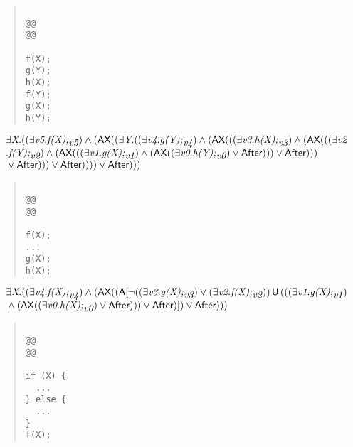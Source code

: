 \documentclass{article}
\newcommand{\U}{\,\mbox{\sf{U}}\,}
\newcommand{\A}{\mbox{\sf{A}}}
\newcommand{\AX}{\mbox{\sf{AX}}}
\newcommand{\mita}[1]{\mbox{\it{{#1}}}}
\newcommand{\msf}[1]{\mbox{\sf{{#1}}}}
\begin{document}
\begin{quote}\begin{verbatim}

@@
@@

f(X);
g(Y);
h(X);
f(Y);
g(X);
h(Y);
\end{verbatim}\end{quote}

\[\begin{array}{l}
\exists \mita{X} . ((\exists \mita{v5} . \mita{f(X);}_{\mita{v5}}) \wedge (\AX((\exists \mita{Y} . ((\exists \mita{v4} . \mita{g(Y);}_{\mita{v4}}) \wedge (\AX(((\exists \mita{v3} . \mita{h(X);}_{\mita{v3}}) \wedge (\AX(((\exists \mita{v2}\\\mbox{} . \mita{f(Y);}_{\mita{v2}}) \wedge (\AX(((\exists \mita{v1} . \mita{g(X);}_{\mita{v1}}) \wedge (\AX((\exists \mita{v0} . \mita{h(Y);}_{\mita{v0}}) \vee \msf{After}))) \vee \msf{After})))\\\mbox{} \vee \msf{After}))) \vee \msf{After})))) \vee \msf{After})))
\end{array}\]

\begin{quote}\begin{verbatim}

@@
@@

f(X);
...
g(X);
h(X);
\end{verbatim}\end{quote}

\[\begin{array}{l}
\exists \mita{X} . ((\exists \mita{v4} . \mita{f(X);}_{\mita{v4}}) \wedge (\AX((\A[\neg ((\exists \mita{v3} . \mita{g(X);}_{\mita{v3}}) \vee (\exists \mita{v2} . \mita{f(X);}_{\mita{v2}})) \U (((\exists \mita{v1} . \mita{g(X);}_{\mita{v1}})\\\mbox{} \wedge (\AX((\exists \mita{v0} . \mita{h(X);}_{\mita{v0}}) \vee \msf{After}))) \vee \msf{After})]
) \vee \msf{After})))
\end{array}\]

\begin{quote}\begin{verbatim}

@@
@@

if (X) {
  ...
} else {
  ...
}
f(X);
\end{verbatim}\end{quote}
\end{document}
